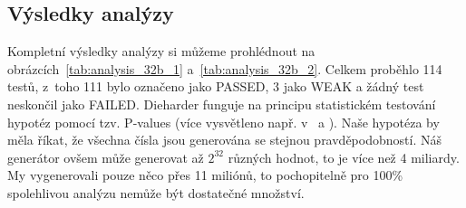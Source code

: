 \documentclass[11pt, a4paper, titlepage]{article}
\begin{document}
\begin{framed}
\end{framed}

\subsection{Výsledky analýzy}
Kompletní výsledky analýzy si můžeme prohlédnout na obrázcích~\ref{tab:analysis_32b_1} a~\ref{tab:analysis_32b_2}. Celkem proběhlo 114 testů, z~toho 111 bylo označeno jako PASSED, 3 jako WEAK a žádný test neskončil jako FAILED. Dieharder funguje na principu statistickém testování hypotéz pomocí tzv. P-values (více vysvětleno např. v~\cite{DIEHARDER} a \cite{P-VALUE}). Naše hypotéza by měla říkat, že všechna čísla jsou generována se stejnou pravděpodobností. Náš generátor ovšem může generovat až $2^{32}$ různých hodnot, to je více než 4 miliardy. My vygenerovali pouze něco přes 11 miliónů, to pochopitelně pro 100\% spolehlivou analýzu nemůže být dostatečné množství.


\newpage
\end{document}
